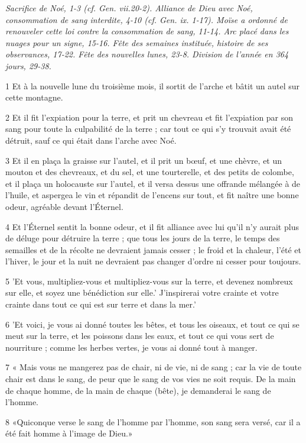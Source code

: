\par \textit{Sacrifice de Noé, 1-3 (cf. Gen. vii.20-2). Alliance de Dieu avec Noé, consommation de sang interdite, 4-10 (cf. Gen. ix. 1-17). Moïse a ordonné de renouveler cette loi contre la consommation de sang, 11-14. Arc placé dans les nuages ​​pour un signe, 15-16. Fête des semaines instituée, histoire de ses observances, 17-22. Fête des nouvelles lunes, 23-8. Division de l'année en 364 jours, 29-38.}

\par 1 Et à la nouvelle lune du troisième mois, il sortit de l'arche et bâtit un autel sur cette montagne.
\par 2 Et il fit l'expiation pour la terre, et prit un chevreau et fit l'expiation par son sang pour toute la culpabilité de la terre ; car tout ce qui s'y trouvait avait été détruit, sauf ce qui était dans l'arche avec Noé.
\par 3 Et il en plaça la graisse sur l'autel, et il prit un bœuf, et une chèvre, et un mouton et des chevreaux, et du sel, et une tourterelle, et des petits de colombe, et il plaça un holocauste sur l'autel, et il versa dessus une offrande mélangée à de l'huile, et aspergea le vin et répandit de l'encens sur tout, et fit naître une bonne odeur, agréable devant l'Éternel.
\par 4 Et l'Éternel sentit la bonne odeur, et il fit alliance avec lui qu'il n'y aurait plus de déluge pour détruire la terre ; que tous les jours de la terre, le temps des semailles et de la récolte ne devraient jamais cesser ; le froid et la chaleur, l'été et l'hiver, le jour et la nuit ne devraient pas changer d'ordre ni cesser pour toujours.
\par 5 'Et vous, multipliez-vous et multipliez-vous sur la terre, et devenez nombreux sur elle, et soyez une bénédiction sur elle.' J'inspirerai votre crainte et votre crainte dans tout ce qui est sur terre et dans la mer.'
\par 6 'Et voici, je vous ai donné toutes les bêtes, et tous les oiseaux, et tout ce qui se meut sur la terre, et les poissons dans les eaux, et tout ce qui vous sert de nourriture ; comme les herbes vertes, je vous ai donné tout à manger.
\par 7 « Mais vous ne mangerez pas de chair, ni de vie, ni de sang ; car la vie de toute chair est dans le sang, de peur que le sang de vos vies ne soit requis. De la main de chaque homme, de la main de chaque (bête), je demanderai le sang de l'homme.
\par 8 «Quiconque verse le sang de l'homme par l'homme, son sang sera versé, car il a été fait homme à l'image de Dieu.»
